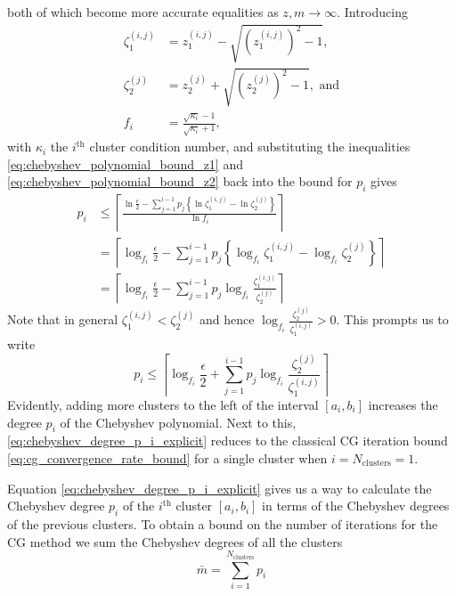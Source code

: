 both of which become more accurate equalities as $z,m\rightarrow\infty$. Introducing 
\begin{align*}
    \zeta^{(i,j)}_1 &= z^{(i,j)}_1 - \sqrt{\left(z^{(i,j)}_1\right)^2 - 1}, \\
    \zeta^{(j)}_2 &= z^{(j)}_2 + \sqrt{\left(z^{(j)}_2\right)^2 - 1}, \text{ and}\\
    f_i &= \frac{\sqrt{\kappa_i} - 1}{\sqrt{\kappa_i} + 1},
\end{align*}
with $\kappa_i$ the $i^{\text{th}}$ cluster condition number, and substituting the inequalities \ref{eq:chebyshev_polynomial_bound_z1} and \ref{eq:chebyshev_polynomial_bound_z2} back into the bound for $p_i$ gives
\begin{align*}
    p_i &\leq \left\lceil\frac{\ln{\frac{\epsilon}{2}} - \sum_{j=1}^{i-1} p_j\left\{\ln{\zeta^{(i,j)}_1} - \ln{\zeta^{(j)}_2} \right\}}{\ln{f_i}}\right\rceil \\
    &= \left\lceil\log_{f_i}{\frac{\epsilon}{2}} - \sum_{j=1}^{i-1} p_j\left\{\log_{f_i}{\zeta^{(i,j)}_1} - \log_{f_i}{\zeta^{(j)}_2} \right\}\right\rceil\\
    &= \left\lceil\log_{f_i}{\frac{\epsilon}{2}} - \sum_{j=1}^{i-1} p_j\log_{f_i}{\frac{\zeta^{(i,j)}_1}{\zeta^{(j)}_2}} \right\rceil
\end{align*}
Note that in general $\zeta^{(i,j)}_1 < \zeta^{(j)}_2$ and hence $\log_{f_i}{\frac{\zeta^{(j)}_2}{\zeta^{(i,j)}_1}} > 0$. This prompts us to write
\begin{equation}
    p_i \leq \left\lceil\log_{f_i}{\frac{\epsilon}{2}} + \sum_{j=1}^{i-1} p_j\log_{f_i}{\frac{\zeta^{(j)}_2}{\zeta^{(i,j)}_1}} \right\rceil
    \label{eq:chebyshev_degree_p_i_explicit}
\end{equation}
Evidently, adding more clusters to the left of the interval $[a_i,b_i]$ increases the degree $p_i$ of the Chebyshev polynomial. Next to this, \cref{eq:chebyshev_degree_p_i_explicit} reduces to the classical CG iteration bound \cref{eq:cg_convergence_rate_bound} for a single cluster when $i = N_{\text{clusters}} = 1$.

Equation \ref{eq:chebyshev_degree_p_i_explicit} gives us a way to calculate the Chebyshev degree $p_i$ of the $i^{\text{th}}$ cluster $[a_i,b_i]$ in terms of the Chebyshev degrees of the previous clusters. To obtain a bound on the number of iterations for the CG method we sum the Chebyshev degrees of all the clusters
\begin{equation}
    \bar{m} = \sum_{i=1}^{N_{\text{clusters}}} p_i
    \label{eq:cg_iteration_bound_multiple_clusters}
\end{equation}

